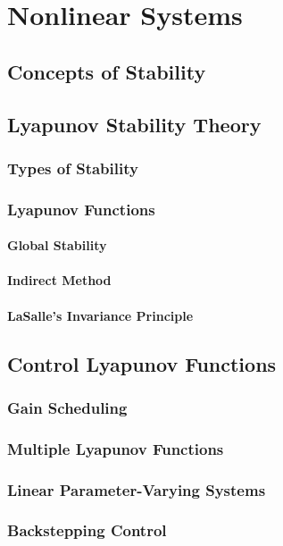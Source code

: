 \section{Nonlinear Systems}

\subsection{Concepts of Stability}

\subsection{Lyapunov Stability Theory}

\subsubsection{Types of Stability}

\subsubsection{Lyapunov Functions}
\paragraph{Global Stability}
\paragraph{Indirect Method}
\paragraph{LaSalle's Invariance Principle}

\subsection{Control Lyapunov Functions}
\subsubsection{Gain Scheduling}
\subsubsection{Multiple Lyapunov Functions}
\subsubsection{Linear Parameter-Varying Systems}
\subsubsection{Backstepping Control}